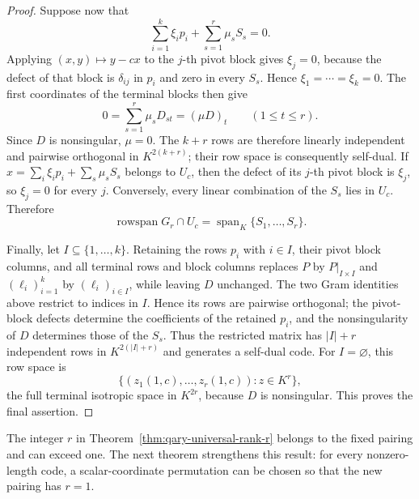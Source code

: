 \documentclass[12pt]{article}
\begin{document}
\begin{proof}
Suppose now that
\[
 \sum_{i=1}^k\xi_i p_i+\sum_{s=1}^r\mu_sS_s=0.
\]
Applying \((x,y)\mapsto y-cx\) to the \(j\)-th pivot block gives
\(\xi_j=0\), because the defect of that block is \(\delta_{ij}\) in
\(p_i\) and zero in every \(S_s\).  Hence \(\xi_1=\cdots=\xi_k=0\).
The first coordinates of the terminal blocks then give
\[
 0=\sum_{s=1}^r\mu_sD_{st}=(\mu D)_t
 \qquad(1\le t\le r).
\]
Since \(D\) is nonsingular, \(\mu=0\).  The \(k+r\) rows are therefore
linearly independent and pairwise orthogonal in \(K^{2(k+r)}\); their row
space is consequently self-dual.  If
\(x=\sum_i\xi_ip_i+\sum_s\mu_sS_s\) belongs to \(U_c\), then the defect of
its \(j\)-th pivot block is \(\xi_j\), so \(\xi_j=0\) for every \(j\).
Conversely, every linear combination of the \(S_s\) lies in \(U_c\).
Therefore
\[
 \operatorname{rowspan}G_r\cap U_c
   =\operatorname{span}_K\{S_1,\ldots,S_r\}.
\]

Finally, let \(I\subseteq\{1,\ldots,k\}\).  Retaining the rows \(p_i\)
with \(i\in I\), their pivot block columns, and all terminal rows and block
columns replaces \(P\) by \(P|_{I\times I}\) and \((\ell_i)_{i=1}^k\) by
\((\ell_i)_{i\in I}\), while leaving \(D\) unchanged.  The two Gram
identities above restrict to indices in \(I\).  Hence its rows are pairwise
orthogonal; the pivot-block defects determine the coefficients of the
retained \(p_i\), and the nonsingularity of \(D\) determines those of the
\(S_s\).  Thus the restricted matrix has \(|I|+r\) independent rows in
\(K^{2(|I|+r)}\) and generates a self-dual code.  For
\(I=\varnothing\), this row space is
\[
 \{(z_1(1,c),\ldots,z_r(1,c)):z\in K^r\},
\]
the full terminal isotropic space in \(K^{2r}\), because \(D\) is
nonsingular.  This proves the final assertion.
\end{proof}

The integer \(r\) in Theorem~\ref{thm:qary-universal-rank-r} belongs to the
fixed pairing and can exceed one.  The next theorem strengthens this result:
for every nonzero-length code, a scalar-coordinate permutation can be chosen
so that the new pairing has \(r=1\).
\end{document}
